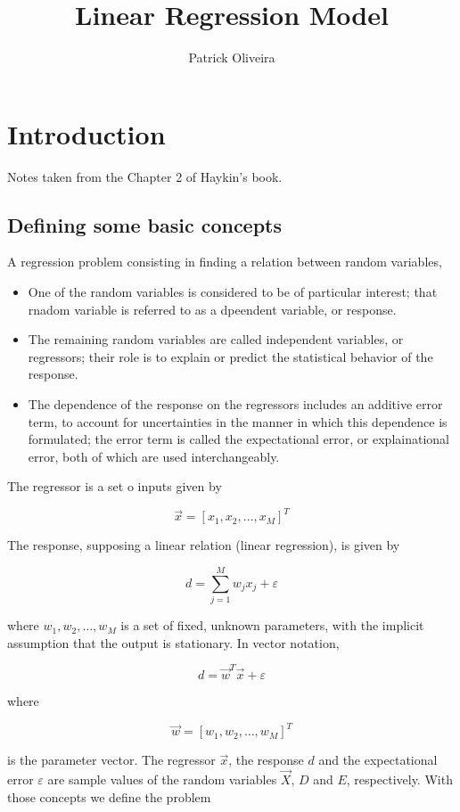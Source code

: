 \documentclass[twocolumn]{article}
\title{Linear Regression Model}
\author{Patrick Oliveira}
\affil{}
\begin{document}
\maketitle

\section{Introduction}
Notes taken from the Chapter 2 of Haykin's book.

\subsection{Defining some basic concepts}

A regression problem consisting in finding a relation between random variables,

\begin{itemize}
	\item One of the random variables is considered to be of particular interest; that rnadom variable is referred to as a dpeendent variable, or response.
	\item The remaining random variables are called independent variables, or regressors; their role is to explain or predict the statistical behavior of the response.
	\item The dependence of the response on the regressors includes an additive error term, to account for uncertainties in the manner in which this dependence is formulated; the error term is called the expectational error, or explainational error, both of which are used interchangeably.
\end{itemize}

The regressor is a set o inputs given by

$$ \vec{x} = \left[ x_{1}, x_{2}, \ldots, x_{M} \right]^{T} $$

The response, supposing a linear relation (linear regression), is given by

$$ d = \sum_{j = 1}^{M}w_{j}x_{j} + \varepsilon $$

\noindent where $ w_{1}, w_{2},\ldots,w_{M} $ is a set of fixed, unknown parameters, with the implicit assumption that the output is stationary. In vector notation,

$$ d = \vec{w}^{T} \vec{x} + \varepsilon $$

\noindent where

$$ \vec{w} = \left[ w_{1}, w_{2}, \ldots, w_{M} \right]^{T} $$

\noindent is the parameter vector. The regressor $ \vec{x} $, the response $ d $ and the expectational error $ \varepsilon $ are sample values of the random variables $ \vec{X} $, $ D $ and $ E $, respectively. With those concepts we define the problem
\end{document}
